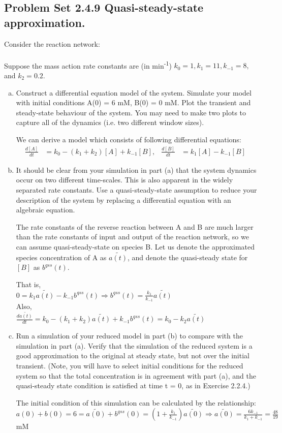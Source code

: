 \documentclass[paper=a4, fontsize=11pt]{scrartcl} %
\numberwithin{equation}{section} %
\numberwithin{figure}{section} %
\numberwithin{table}{section} %
\begin{document}
\subsection{Problem Set 2.4.9 Quasi-steady-state approximation.}
	Consider the reaction network:\\
	\\
	Suppose the mass action rate constants are (in min\textsuperscript{-1}) $k_{0}=1, k_{1} = 11, k_{-1} = 8,$ and $k_{2} = 0.2$.
	\begin{enumerate}[a)]
		\item Construct a differential equation model of the system. Simulate your model with initial conditions A(0) = 6 mM, B(0) = 0 mM. Plot the transient and steady-state behaviour of the system. You may need to make two plots to capture all of the dynamics (i.e. two different window sizes).

		We can derive a model which consists of following differential equations:
		\begin{align*}
			\frac{d\left[A\right]}{dt}&=k_0-(k_1+k_2)\left[A\right]+k_{-1}\left[B\right],& \frac{d\left[B\right]}{dt}&=k_{1}\left[A\right]-k_{-1}\left[B\right]&
		\end{align*}

		\item It should be clear from your simulation in part (a) that the system dynamics occur on two different time-scales. This is also apparent in the widely separated rate constants. Use a quasi-steady-state assumption to reduce your description of the system by replacing a differential equation with an algebraic equation.

		The rate constants of the reverse reaction between A and B are much larger than the rate constants of input and output of the reaction network, so we can assume quasi-steady-state on species B. Let us denote the approximated species concentration of A as $\tilde{a(t)}$, and denote the quasi-steady state for $\left[B\right]$ as $b^{qss}(t)$.

		That is,\\
		$0=k_1\tilde{a(t)}-k_{-1}b^{qss}(t)\Rightarrow b^{qss}(t)=\frac{k_1}{k_{-1}}\tilde{a(t)}$\\
		Also,\\
		$\frac{d\tilde{a(t)}}{dt}=k_0-(k_1+k_2)\tilde{a(t)}+k_{-1}b^{qss}(t)=k_0-k_2\tilde{a(t)}$

		\item Run a simulation of your reduced model in part (b) to compare with the simulation in part (a). Verify that the simulation of the reduced system is a good approximation to the original at steady state, but not over the initial transient. (Note, you will have to select initial conditions for the reduced system so that the total concentration is in agreement with part (a), and the quasi-steady state condition is satisfied at time t = 0, as in Exercise 2.2.4.)

		The initial condition of this simulation can be calculated by the relationship:\\
		$a(0)+b(0)=6=\tilde{a(0)}+b^{qss}(0)=(1+\frac{k_1}{k_{-1}})\tilde{a(0)}\Rightarrow \tilde{a(0)}=\frac{6k_{-1}}{k_1+k_{-1}}=\frac{48}{19}$ mM
	\end{enumerate}
\end{document}

